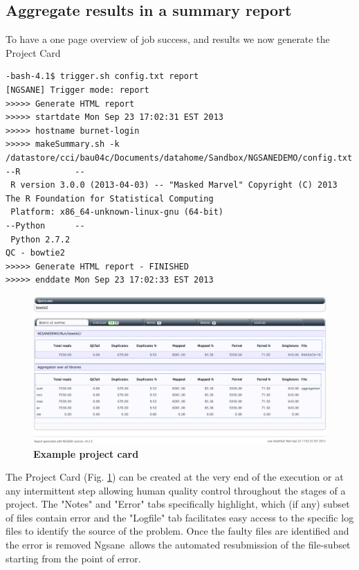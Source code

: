 \documentclass{article}
\newcommand{\prog}{{\sc Ngsane}}
\begin{document}
\subsection{Aggregate results in a summary report}
To have a one page overview of job success, and results we now generate the Project Card
\begin{small}\begin{verbatim}
-bash-4.1$ trigger.sh config.txt report
[NGSANE] Trigger mode: report
>>>>> Generate HTML report
>>>>> startdate Mon Sep 23 17:02:31 EST 2013
>>>>> hostname burnet-login
>>>>> makeSummary.sh -k /datastore/cci/bau04c/Documents/datahome/Sandbox/NGSANEDEMO/config.txt
--R           --
 R version 3.0.0 (2013-04-03) -- "Masked Marvel" Copyright (C) 2013 The R Foundation for Statistical Computing 
 Platform: x86_64-unknown-linux-gnu (64-bit)
--Python      --
 Python 2.7.2
QC - bowtie2
>>>>> Generate HTML report - FINISHED
>>>>> enddate Mon Sep 23 17:02:33 EST 2013
\end{verbatim}\end{small}

\begin{figure}[h!]
    \centering
   \includegraphics[type=pdf,ext=.pdf,read=.pdf, scale=0.4]{NGSANEprojectcard}
    \caption{
      {\bf Example project card}} 
      \label{fig:overview}
\end{figure}

The Project Card (Fig. \ref{fig:overview}) can be created at the very end of the execution or at any intermittent step allowing human quality control throughout the stages of a project. The "Notes" and "Error" tabs specifically highlight, which (if any) subset of files contain error and the "Logfile" tab facilitates easy access to the specific log files to identify the source of the problem. Once the faulty files are identified and the error is removed \prog\ allows the automated resubmission of the file-subset starting from the point of error. 
\end{document}
